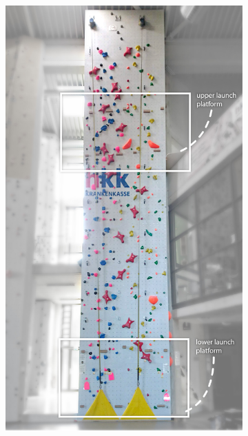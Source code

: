 \begin{figure}[ht]
	\centering
	\begin{subfigure}[t]{.4825\textwidth}
		\vspace*{\fill}
		\centering
		\includegraphics[width=\textwidth]{include/images/climbing-wall-photo.jpg}
		\label{fig:climbing-wall-photo}
	\end{subfigure}%
	\hfill
	\begin{subfigure}[t]{.48\textwidth}

\end{subfigure}
\end{figure}
